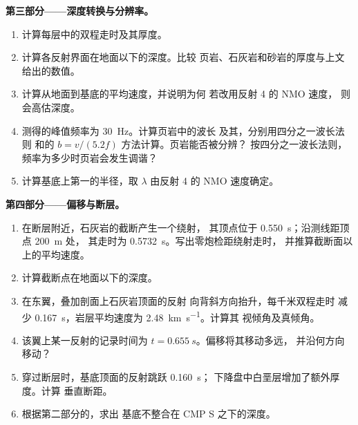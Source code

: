 \begin{problem}
\noindent\textbf{第三部分——深度转换与分辨率。}
\begin{enumerate}[resume]
  \item 计算每层中的双程走时及其厚度。
  \item 计算各反射界面在地面以下的深度。比较
        页岩、石灰岩和砂岩的厚度与上文
        给出的数值。
  \item 计算从地面到基底的平均速度，并说明为何
        若改用反射 4 的 NMO 速度，
        则会高估深度。
  \item 测得的峰值频率为 \qty{30}{Hz}。计算页岩中的波长
        及其，分别用四分之一波长法则
        和的 $b = v/(5.2f)$ 方法计算。页岩能否被分辨？
        按四分之一波长法则，频率为多少时页岩会发生调谐？
  \item 计算基底上第一的半径，取
        $\lambda$ 由反射 4 的 NMO 速度确定。
\end{enumerate}

\noindent\textbf{第四部分——偏移与断层。}
\begin{enumerate}[resume]
  \item 在断层附近，石灰岩的截断产生一个绕射，
        其顶点位于 \qty{0.550}{s}；沿测线距顶点 \qty{200}{m} 处，
        其走时为 \qty{0.5732}{s}。写出零炮检距绕射走时，
        并推算截断面以上的平均速度。
  \item 计算截断点在地面以下的深度。
  \item 在东翼，叠加剖面上石灰岩顶面的反射
        向背斜方向抬升，每千米双程走时
        减少 \qty{0.167}{s}，岩层平均速度为 \qty{2.48}{km.s^{-1}}。计算其
        视倾角及真倾角。
  \item 该翼上某一反射的记录时间为 $t = \qty{0.655}{s}$。偏移将其移动多远，
        并沿何方向移动？
  \item 穿过断层时，基底顶面的反射跳跃 \qty{0.160}{s}；
        下降盘中白垩层增加了额外厚度。计算
        垂直断距。
  \item 根据第二部分的，求出
        基底不整合在 CMP S 之下的深度。
\end{enumerate}
\end{problem}
